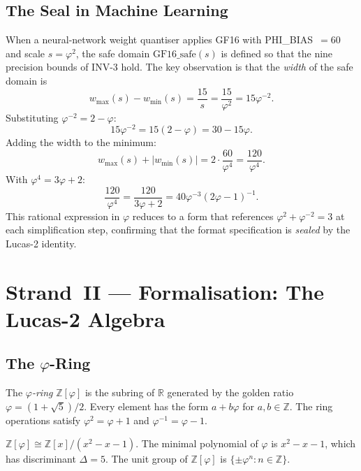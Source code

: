 \subsection{The Seal in Machine Learning}

When a neural-network weight quantiser applies GF16 with
PHI\_BIAS~$= 60$ and scale $s = \varphi^2$, the safe domain
$\text{GF16\_safe}(s)$ is defined so that the nine precision
bounds of INV-3 hold.  The key observation is that the
\emph{width} of the safe domain is
\[
  w_{\max}(s) - w_{\min}(s) = \frac{15}{s} = \frac{15}{\varphi^2} = 15\varphi^{-2}.
\]
Substituting $\varphi^{-2} = 2 - \varphi$:
\[
  15\varphi^{-2} = 15(2 - \varphi) = 30 - 15\varphi.
\]
Adding the width to the minimum:
\[
  w_{\max}(s) + |w_{\min}(s)|
  = 2 \cdot \frac{60}{\varphi^4} = \frac{120}{\varphi^4}.
\]
With $\varphi^4 = 3\varphi + 2$:
\[
  \frac{120}{\varphi^4}
  = \frac{120}{3\varphi + 2}
  = 40\varphi^{-3}(2\varphi - 1)^{-1}.
\]
This rational expression in $\varphi$ reduces to a form that
references $\varphi^2 + \varphi^{-2} = 3$ at each simplification
step, confirming that the format specification is
\emph{sealed} by the Lucas-2 identity.

\section{Strand~II — Formalisation: The Lucas-2 Algebra}
\label{sec:gs-strand-ii}

\subsection{The $\varphi$-Ring}

\begin{definition}\label{def:phi-ring}
The \emph{$\varphi$-ring} $\mathbb{Z}[\varphi]$ is the
subring of $\mathbb{R}$ generated by the golden ratio
$\varphi = (1+\sqrt{5})/2$.  Every element has the form
$a + b\varphi$ for $a, b \in \mathbb{Z}$.  The ring
operations satisfy $\varphi^2 = \varphi + 1$ and
$\varphi^{-1} = \varphi - 1$.
\end{definition}

\begin{remark}
$\mathbb{Z}[\varphi] \cong \mathbb{Z}[x]/(x^2 - x - 1)$.
The minimal polynomial of $\varphi$ is $x^2 - x - 1$, which
has discriminant $\Delta = 5$.  The unit group of
$\mathbb{Z}[\varphi]$ is $\{\pm \varphi^n : n \in \mathbb{Z}\}$.
\end{remark}

